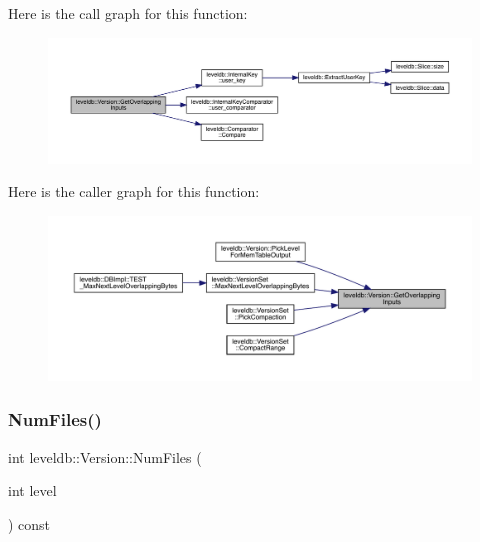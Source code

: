 Here is the call graph for this function\+:
\nopagebreak
\begin{figure}[H]
\begin{center}
\leavevmode
\includegraphics[width=350pt]{classleveldb_1_1_version_afd86dffba7ce5229778bddd546517392_cgraph}
\end{center}
\end{figure}
Here is the caller graph for this function\+:
\nopagebreak
\begin{figure}[H]
\begin{center}
\leavevmode
\includegraphics[width=350pt]{classleveldb_1_1_version_afd86dffba7ce5229778bddd546517392_icgraph}
\end{center}
\end{figure}
\mbox{\label{classleveldb_1_1_version_a3860dac2fe3c61ef20edb8482a2a3746}} 
\subsubsection{\texorpdfstring{NumFiles()}{NumFiles()}}
{\footnotesize\ttfamily int leveldb\+::\+Version\+::\+Num\+Files (\begin{DoxyParamCaption}\item[{int}]{level }\end{DoxyParamCaption}) const\hspace{0.3cm}{\ttfamily [inline]}}

\mbox{\label{classleveldb_1_1_version_a7945e88b8a4f2f7b6f3201cb3d791f1e}} 
